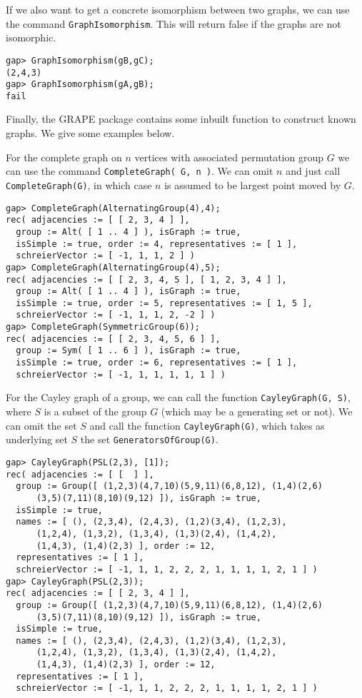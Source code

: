 If we also want to get a concrete isomorphism between two graphs, we can use the command \lstinline{GraphIsomorphism}.
This will return false if the graphs are not isomorphic.

\begin{lstlisting}
gap> GraphIsomorphism(gB,gC);
(2,4,3)
gap> GraphIsomorphism(gA,gB);
fail
\end{lstlisting}

Finally, the GRAPE package contains some inbuilt function to construct known graphs.
We give some examples below.

For the complete graph on $n$ vertices with associated permutation group $G$ we can use the command \lstinline{CompleteGraph( G, n )}.
We can omit $n$ and just call \lstinline{CompleteGraph(G)}, in which case $n$ is assumed to be largest point moved by $G$.

\begin{lstlisting}
gap> CompleteGraph(AlternatingGroup(4),4);
rec( adjacencies := [ [ 2, 3, 4 ] ],
  group := Alt( [ 1 .. 4 ] ), isGraph := true,
  isSimple := true, order := 4, representatives := [ 1 ],
  schreierVector := [ -1, 1, 1, 2 ] )
gap> CompleteGraph(AlternatingGroup(4),5);
rec( adjacencies := [ [ 2, 3, 4, 5 ], [ 1, 2, 3, 4 ] ],
  group := Alt( [ 1 .. 4 ] ), isGraph := true,
  isSimple := true, order := 5, representatives := [ 1, 5 ],
  schreierVector := [ -1, 1, 1, 2, -2 ] )
gap> CompleteGraph(SymmetricGroup(6));
rec( adjacencies := [ [ 2, 3, 4, 5, 6 ] ],
  group := Sym( [ 1 .. 6 ] ), isGraph := true,
  isSimple := true, order := 6, representatives := [ 1 ],
  schreierVector := [ -1, 1, 1, 1, 1, 1 ] )
\end{lstlisting}

For the Cayley graph of a group, we can call the function \lstinline{CayleyGraph(G, S)}, where $S$ is a subset of the group $G$ (which may be a generating set or not).
We can omit the set $S$ and call the function \lstinline{CayleyGraph(G)}, which takes as underlying set $S$ the set  \lstinline{GeneratorsOfGroup(G)}.

\begin{lstlisting}
gap> CayleyGraph(PSL(2,3), [1]);
rec( adjacencies := [ [  ] ],
  group := Group([ (1,2,3)(4,7,10)(5,9,11)(6,8,12), (1,4)(2,6)
      (3,5)(7,11)(8,10)(9,12) ]), isGraph := true,
  isSimple := true,
  names := [ (), (2,3,4), (2,4,3), (1,2)(3,4), (1,2,3),
      (1,2,4), (1,3,2), (1,3,4), (1,3)(2,4), (1,4,2),
      (1,4,3), (1,4)(2,3) ], order := 12,
  representatives := [ 1 ],
  schreierVector := [ -1, 1, 1, 2, 2, 2, 1, 1, 1, 1, 2, 1 ] )
gap> CayleyGraph(PSL(2,3));
rec( adjacencies := [ [ 2, 3, 4 ] ],
  group := Group([ (1,2,3)(4,7,10)(5,9,11)(6,8,12), (1,4)(2,6)
      (3,5)(7,11)(8,10)(9,12) ]), isGraph := true,
  isSimple := true,
  names := [ (), (2,3,4), (2,4,3), (1,2)(3,4), (1,2,3),
      (1,2,4), (1,3,2), (1,3,4), (1,3)(2,4), (1,4,2),
      (1,4,3), (1,4)(2,3) ], order := 12,
  representatives := [ 1 ],
  schreierVector := [ -1, 1, 1, 2, 2, 2, 1, 1, 1, 1, 2, 1 ] )
\end{lstlisting}

